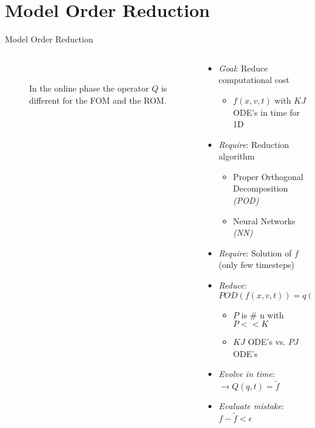 \documentclass[usenames,dvipsnames,Nike,mathserif]{tuberlinbeamer}
\begin{document}
\section{Model Order Reduction}
\begin{frame}[fragile]{Model Order Reduction}
	\begin{columns}
		\begin{column}{.5\textwidth}
			\begin{figure}
				\\
				\caption{In the online phase the operator $Q$ is different for the FOM and the ROM.}
			\end{figure}
		\end{column}
		\begin{column}{.5\textwidth}
			\begin{itemize}
				\item<1->\emph{Goal}: Reduce computational cost
				\begin{itemize}
					\item<2->$f(x,v,t)$ with $KJ$ ODE's in time for 1D
				\end{itemize}
				\item<3-> \emph{Require}: Reduction algorithm 
				\begin{itemize}
					\item<4-> Proper Orthogonal Decomposition \emph{(POD)}
					\item<4-> Neural Networks \emph{(NN)}
				\end{itemize}
				\item<5->\emph{Require}: Solution of $f$ (only few timesteps)
				\item<6->\emph{Reduce}: $POD(f(x,v,t))=q(x,n,t)$
				\begin{itemize}
					\item<7->$P$ is \# n with $P<<K$
					\item<8->$KJ$ ODE's vs. $PJ$ ODE's
				\end{itemize}
				\item<9->\emph{Evolve in time}:  $\rightarrow Q(q,t)=\tilde{f}$
				\item<10->\emph{Evaluate mistake}: $f-\tilde{f}<\epsilon$
				
			\end{itemize}
		\end{column}
	\end{columns}
\end{frame}
\end{document}
